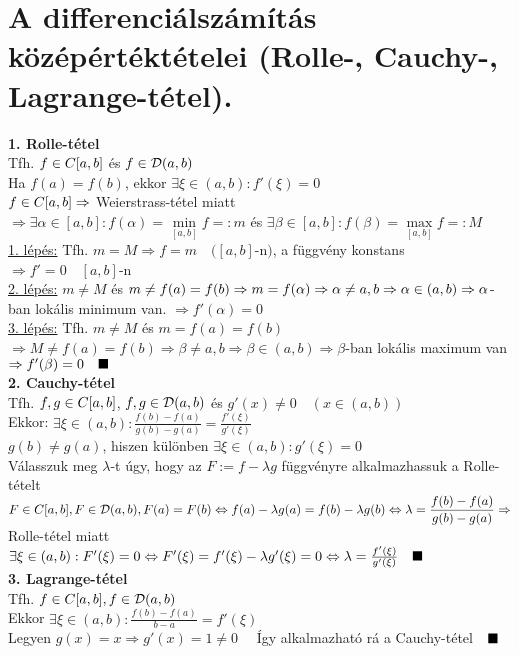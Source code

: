\documentclass[a4paper,12pt]{article}
\begin{document}
\section{A differenciálszámítás középértéktételei (Rolle-, Cauchy-, Lagrange-tétel).}
\textbf{1. Rolle-tétel}\\[0.1cm]\tetel Tfh. $f\in C[a,b]$ és $f\in \displaystyle\mathcal{D}(a,b)$\\[0.2cm]Ha $f(a)=f(b)$, ekkor $\exists\xi\in(a,b):f'(\xi)=0$\\[0.2cm]\biz $f\in C[a,b]\Rightarrow$ Weierstrass-tétel miatt\\[0.2cm]$\Rightarrow\exists\alpha\in[a,b]:f(\alpha)= \min\limits_{[a,b]}f=:m$ és $\exists\beta\in[a,b]:f(\beta)= \max\limits_{[a,b]}f=:M$
\\[0.2cm]\underline{1. lépés:} Tfh. $m=M\Rightarrow f=m\quad([a,b]$-n$)$, a függvény konstans $\Rightarrow f'=0\quad[a,b]$-n\\[0.2cm]\underline{2. lépés:} $m\neq M$ és $m\neq f(a)=f(b)\Rightarrow m=f(\alpha)\Rightarrow\alpha\neq a,b \Rightarrow\alpha\in(a,b)\\[0.2cm]\Rightarrow\alpha$-ban lokális minimum van. $\Rightarrow f'(\alpha)=0$\\[0.2cm]\underline{3. lépés:} Tfh. $m\neq M$ és $m=f(a) =f(b)$\\[0.2cm]$\Rightarrow M\neq f(a)=f(b)\Rightarrow\beta\neq a,b\Rightarrow\beta \in(a,b)\Rightarrow\beta$-ban lokális maximum van $\Rightarrow f'(\beta)=0\quad\blacksquare$ \\[0.2cm]\textbf{2. Cauchy-tétel}\\[0.1cm]\tetel Tfh. $f,g\in C[a,b]$, $f,g\in \displaystyle\mathcal{D}(a,b)$ és $g'(x)\neq0\quad(x\in(a,b))$\\[0.2cm]Ekkor: $\exists\xi\in(a,b): \frac{f(b)-f(a)}{g(b)-g(a)}=\frac{f'(\xi)}{g'(\xi)}$\\[0.2cm]\biz
$g(b)\neq g(a)$, hiszen különben $\exists\xi\in(a,b):g'(\xi)=0$\\[0.2cm]Válasszuk meg $\lambda$-t úgy, hogy az $F:=f-\lambda g$ függvényre alkalmazhassuk a Rolle-tételt\\[0.2cm]$F\in C[a,b],F\in \displaystyle\mathcal{D}(a,b), F(a)=F(b)\Leftrightarrow f(a)-\lambda g(a)= f(b)-\lambda g(b)\Leftrightarrow\lambda=\frac{f(b)-f(a)}{g(b)-g(a)}\\[0.2cm] \Rightarrow$ Rolle-tétel miatt $\exists\xi\in(a,b):F'(\xi)=0\Leftrightarrow F'(\xi) =f'(\xi)-\lambda g'(\xi)=0\Leftrightarrow\lambda=\frac{f'(\xi)}{g'(\xi)}\quad\blacksquare$ \\[0.2cm]\textbf{3. Lagrange-tétel}\\[0.1cm]\tetel Tfh. $f\in C[a,b],f\in \displaystyle\mathcal{D}(a,b)$\\[0.2cm]Ekkor $\exists\xi\in(a,b):\frac{f(b)-f(a)}{b-a}=f'(\xi)$\\[0.2cm]\biz Legyen $g(x)=x \Rightarrow g'(x)=1\neq0\quad$ Így alkalmazható rá a Cauchy-tétel$\quad\blacksquare$
\end{document}
